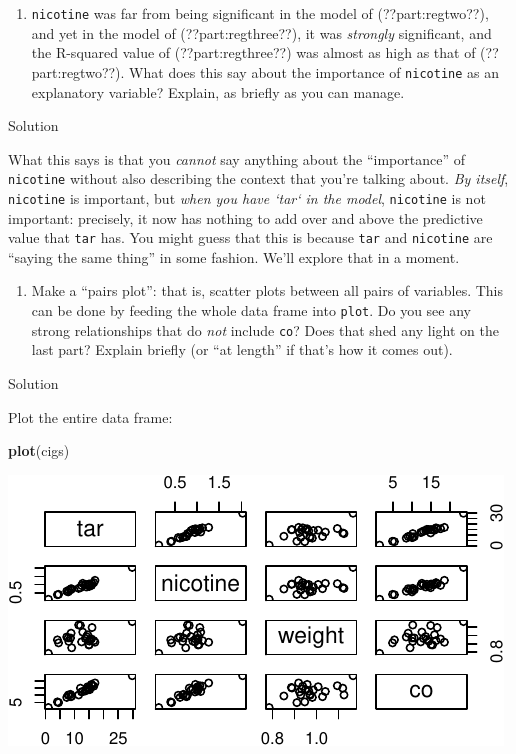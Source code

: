 \documentclass[]{tufte-book}
\newenvironment{Shaded}{}{}
\newcommand{\KeywordTok}[1]{\textcolor[rgb]{0.00,0.44,0.13}{\textbf{#1}}}
\newcommand{\NormalTok}[1]{#1}
\providecommand{\tightlist}{%
  \setlength{\itemsep}{0pt}\setlength{\parskip}{0pt}}
\theoremstyle{definition}
\theoremstyle{definition}
\theoremstyle{definition}
\theoremstyle{remark}
\begin{document}
\begin{enumerate}
\def\labelenumi{(\alph{enumi})}
\setcounter{enumi}{4}
\tightlist
\item
  \texttt{nicotine} was far from being significant in the model of
  (??part:regtwo??), and yet in the model of (??part:regthree??), it was
  \emph{strongly} significant, and the R-squared value of
  (??part:regthree??) was almost as high as that of (??part:regtwo??).
  What does this say about the importance of \texttt{nicotine} as an
  explanatory variable? Explain, as briefly as you can manage.
\end{enumerate}

Solution

What this says is that you \emph{cannot} say anything about the
``importance'' of \texttt{nicotine} without also describing the context
that you're talking about. \emph{By itself}, \texttt{nicotine} is
important, but \emph{when you have
`tar` in the model}, \texttt{nicotine} is not important: precisely, it
now has nothing to add over and above the predictive value that
\texttt{tar} has. You might guess that this is because \texttt{tar} and
\texttt{nicotine} are ``saying the same thing'' in some fashion. We'll
explore that in a moment.

\begin{enumerate}
\def\labelenumi{(\alph{enumi})}
\setcounter{enumi}{5}
\tightlist
\item
  Make a ``pairs plot'': that is, scatter plots between all pairs of
  variables. This can be done by feeding the whole data frame into
  \texttt{plot}.
  Do you see any strong relationships that do \emph{not} include
  \texttt{co}? Does that shed any light on the last part? Explain
  briefly (or ``at length'' if that's how it comes out).
\end{enumerate}

Solution

Plot the entire data frame:

\begin{Shaded}
\begin{Highlighting}[]
\KeywordTok{plot}\NormalTok{(cigs)}
\end{Highlighting}
\end{Shaded}

\includegraphics{12-regression_files/figure-latex/unnamed-chunk-23-1}
\end{document}
